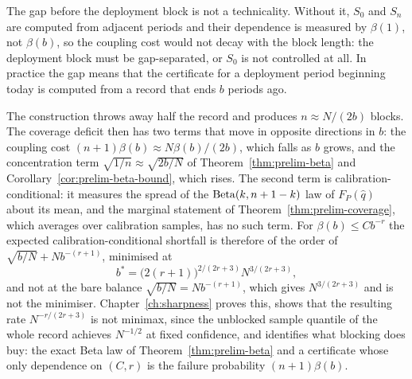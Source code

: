 \documentclass[../../../main.tex]{subfiles}
\begin{document}
The gap before the deployment block is not a technicality. Without it, $S_0$ and $S_n$ are computed from adjacent periods and their dependence is measured by $\beta(1)$, not $\beta(b)$, so the coupling cost would not decay with the block length: the deployment block must be gap-separated, or $S_0$ is not controlled at all. In practice the gap means that the certificate for a deployment period beginning today is computed from a record that ends $b$ periods ago.

The construction throws away half the record and produces $n\approx N/(2b)$ blocks. The coverage deficit then has two terms that move in opposite directions in $b$: the coupling cost $(n+1)\beta(b)\approx N\beta(b)/(2b)$, which falls as $b$ grows, and the concentration term $\sqrt{1/n}\approx\sqrt{2b/N}$ of Theorem~\ref{thm:prelim-beta} and Corollary~\ref{cor:prelim-beta-bound}, which rises. The second term is calibration-conditional: it measures the spread of the $\operatorname{Beta}(k,n+1-k)$ law of $F_P(\hat q)$ about its mean, and the marginal statement of Theorem~\ref{thm:prelim-coverage}, which averages over calibration samples, has no such term. For $\beta(b)\le Cb^{-r}$ the expected calibration-conditional shortfall is therefore of the order of $\sqrt{b/N}+Nb^{-(r+1)}$, minimised at
\[
b^*=\big(2(r+1)\big)^{2/(2r+3)}N^{3/(2r+3)},
\]
and not at the bare balance $\sqrt{b/N}=Nb^{-(r+1)}$, which gives $N^{3/(2r+3)}$ and is not the minimiser. Chapter~\ref{ch:sharpness} proves this, shows that the resulting rate $N^{-r/(2r+3)}$ is not minimax, since the unblocked sample quantile of the whole record achieves $N^{-1/2}$ at fixed confidence, and identifies what blocking does buy: the exact Beta law of Theorem~\ref{thm:prelim-beta} and a certificate whose only dependence on $(C,r)$ is the failure probability $(n+1)\beta(b)$.

\end{document}

